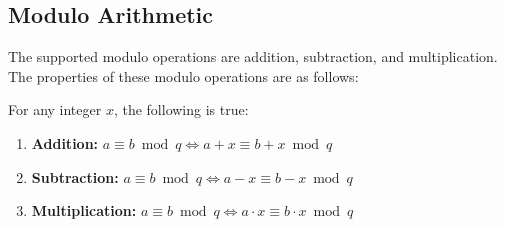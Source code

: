\subsection{Modulo Arithmetic}
\label{subsec:modulo-arithmetic}

The supported modulo operations are addition, subtraction, and multiplication. The properties of these modulo operations are as follows:

\begin{tcolorbox}[title={\textbf{\tboxtheorem{\ref*{subsec:modulo-arithmetic}.1} Properties of Modulo Operations}}]
For any integer $x$, the following is true:

\begin{enumerate}
\item \textbf{Addition:} $a \equiv b \bmod q \Longleftrightarrow a + x\equiv b + x\bmod q$

\item \textbf{Subtraction:} $a \equiv b \bmod q \Longleftrightarrow a - x\equiv b - x\bmod q$

\item \textbf{Multiplication:} $a \equiv b \bmod q \Longleftrightarrow a \cdot x\equiv b \cdot x\bmod q$

\end{enumerate}

\end{tcolorbox}

